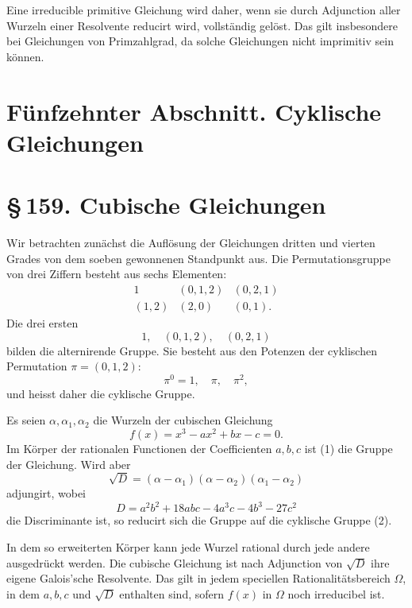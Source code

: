\documentclass[11pt]{article}
\providecommand{\sect}[2]{\section*{\S\,#1. #2}}
\begin{document}
Eine irreducible primitive Gleichung wird daher, wenn sie durch Adjunction aller Wurzeln einer Resolvente reducirt wird, vollständig gelöst. Das gilt insbesondere bei Gleichungen von Primzahlgrad, da solche Gleichungen nicht imprimitiv sein können.

\section*{Fünfzehnter Abschnitt. Cyklische Gleichungen}

\sect{159}{Cubische Gleichungen}

Wir betrachten zunächst die Auflösung der Gleichungen dritten und vierten Grades von dem soeben gewonnenen Standpunkt aus. Die Permutationsgruppe von drei Ziffern besteht aus sechs Elementen:
\[
\begin{array}{ccc}
        1 & (0,1,2) & (0,2,1)\\[0.25em]
        (1,2) & (2,0) & (0,1).
\end{array}
\tag{1}
\]
Die drei ersten
\[
        1,
\quad (0,1,2),
\quad (0,2,1)
\]
bilden die alternirende Gruppe. Sie besteht aus den Potenzen der cyklischen Permutation $\pi=(0,1,2)$:
\[
        \pi^0=1,
\quad \pi,
\quad \pi^2,
\tag{2}
\]
und heisst daher die cyklische Gruppe.

Es seien $\alpha,\alpha_1,\alpha_2$ die Wurzeln der cubischen Gleichung
\[
        f(x)=x^3-ax^2+bx-c=0.
\tag{3}
\]
Im Körper der rationalen Functionen der Coefficienten $a,b,c$ ist (1) die Gruppe der Gleichung. Wird aber
\[
        \sqrt D=(\alpha-\alpha_1)(\alpha-\alpha_2)(\alpha_1-\alpha_2)
\tag{4}
\]
adjungirt, wobei
\[
        D=a^2b^2+18abc-4a^3c-4b^3-27c^2
\tag{5}
\]
die Discriminante ist, so reducirt sich die Gruppe auf die cyklische Gruppe (2).

In dem so erweiterten Körper kann jede Wurzel rational durch jede andere ausgedrückt werden. Die cubische Gleichung ist nach Adjunction von $\sqrt D$ ihre eigene Galois'sche Resolvente. Das gilt in jedem speciellen Rationalitätsbereich $\Omega$, in dem $a,b,c$ und $\sqrt D$ enthalten sind, sofern $f(x)$ in $\Omega$ noch irreducibel ist.
\end{document}
